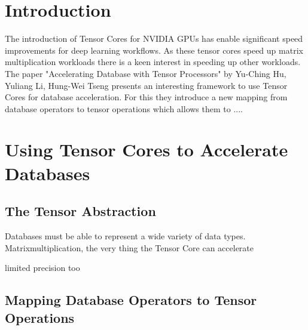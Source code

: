 \documentclass{paper}
\title{\titleVar}
\author{David Raphael Zollikofer\\ ETH Zürich}
\date{\today}
\begin{document}
	

	

\section{Introduction}
The introduction of Tensor Cores for NVIDIA GPUs has enable significant speed improvements for deep learning workflows. As these tensor cores speed up matrix multiplication workloads there is a keen interest in speeding up other workloads. The paper "Accelerating Database with Tensor Processors" by Yu-Ching Hu, Yuliang Li, Hung-Wei Tseng \cite{hu2021tcudb} presents an interesting framework to use Tensor Cores for database acceleration. For this they introduce a new mapping from database operators to tensor operations which allows them to ....
	
	\section{Using Tensor Cores to Accelerate Databases}
	
	\subsection{The Tensor Abstraction}
	Databases must be able to represent a wide variety of data types. Matrixmultiplication, the very thing the Tensor Core can accelerate 
	
	limited precision too 
	
	
	
	\subsection{Mapping Database Operators to Tensor Operations}
	
\end{document}
